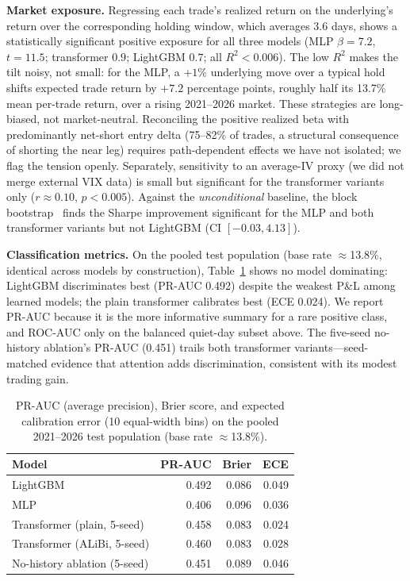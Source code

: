 \documentclass[sigconf,review]{acmart}
\begin{document}
\noindent\textbf{Market exposure.} Regressing each trade's realized return on the underlying's return over the corresponding holding window, which averages 3.6 days, shows a statistically significant positive exposure for all three models (MLP $\beta=7.2$, $t=11.5$; transformer $0.9$; LightGBM $0.7$; all $R^2<0.006$). The low $R^2$ makes the tilt noisy, not small: for the MLP, a $+1\%$ underlying move over a typical hold shifts expected trade return by $+7.2$ percentage points, roughly half its 13.7\% mean per-trade return, over a rising 2021--2026 market. These strategies are long-biased, not market-neutral. Reconciling the positive realized beta with predominantly net-short entry delta (75--82\% of trades, a structural consequence of shorting the near leg) requires path-dependent effects we have not isolated; we flag the tension openly. Separately, sensitivity to an average-IV proxy (we did not merge external VIX data) is small but significant for the transformer variants only ($r\approx0.10$, $p<0.005$). Against the \emph{unconditional} baseline, the block bootstrap~\cite{kunsch1989} finds the Sharpe improvement significant for the MLP and both transformer variants but not LightGBM (CI $[-0.03,4.13]$).

\noindent\textbf{Classification metrics.} On the pooled test population (base rate $\approx$13.8\%, identical across models by construction), Table~\ref{tab:calibration} shows no model dominating: LightGBM discriminates best (PR-AUC 0.492) despite the weakest P\&L among learned models; the plain transformer calibrates best (ECE 0.024). We report PR-AUC because it is the more informative summary for a rare positive class, and ROC-AUC only on the balanced quiet-day subset above. The five-seed no-history ablation's PR-AUC (0.451) trails both transformer variants---seed-matched evidence that attention adds discrimination, consistent with its modest trading gain.

\begin{table}[t]
\centering
\footnotesize
\begin{tabular}{lrrr}
\toprule
Model & PR-AUC & Brier & ECE \\
\midrule
LightGBM & 0.492 & 0.086 & 0.049 \\
MLP & 0.406 & 0.096 & 0.036 \\
Transformer (plain, 5-seed) & 0.458 & 0.083 & 0.024 \\
Transformer (ALiBi, 5-seed) & 0.460 & 0.083 & 0.028 \\
No-history ablation (5-seed) & 0.451 & 0.089 & 0.046 \\
\bottomrule
\end{tabular}
\caption{PR-AUC (average precision), Brier score, and expected calibration error (10 equal-width bins) on the pooled 2021--2026 test population (base rate $\approx$13.8\%).}
\label{tab:calibration}
\end{table}
\end{document}
